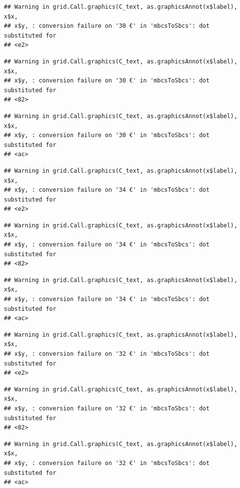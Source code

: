 \documentclass[]{gitbook}
\begin{document}
\begin{verbatim}
## Warning in grid.Call.graphics(C_text, as.graphicsAnnot(x$label), x$x,
## x$y, : conversion failure on '30 €' in 'mbcsToSbcs': dot substituted for
## <e2>
\end{verbatim}

\begin{verbatim}
## Warning in grid.Call.graphics(C_text, as.graphicsAnnot(x$label), x$x,
## x$y, : conversion failure on '30 €' in 'mbcsToSbcs': dot substituted for
## <82>
\end{verbatim}

\begin{verbatim}
## Warning in grid.Call.graphics(C_text, as.graphicsAnnot(x$label), x$x,
## x$y, : conversion failure on '30 €' in 'mbcsToSbcs': dot substituted for
## <ac>
\end{verbatim}

\begin{verbatim}
## Warning in grid.Call.graphics(C_text, as.graphicsAnnot(x$label), x$x,
## x$y, : conversion failure on '34 €' in 'mbcsToSbcs': dot substituted for
## <e2>
\end{verbatim}

\begin{verbatim}
## Warning in grid.Call.graphics(C_text, as.graphicsAnnot(x$label), x$x,
## x$y, : conversion failure on '34 €' in 'mbcsToSbcs': dot substituted for
## <82>
\end{verbatim}

\begin{verbatim}
## Warning in grid.Call.graphics(C_text, as.graphicsAnnot(x$label), x$x,
## x$y, : conversion failure on '34 €' in 'mbcsToSbcs': dot substituted for
## <ac>
\end{verbatim}

\begin{verbatim}
## Warning in grid.Call.graphics(C_text, as.graphicsAnnot(x$label), x$x,
## x$y, : conversion failure on '32 €' in 'mbcsToSbcs': dot substituted for
## <e2>
\end{verbatim}

\begin{verbatim}
## Warning in grid.Call.graphics(C_text, as.graphicsAnnot(x$label), x$x,
## x$y, : conversion failure on '32 €' in 'mbcsToSbcs': dot substituted for
## <82>
\end{verbatim}

\begin{verbatim}
## Warning in grid.Call.graphics(C_text, as.graphicsAnnot(x$label), x$x,
## x$y, : conversion failure on '32 €' in 'mbcsToSbcs': dot substituted for
## <ac>
\end{verbatim}
\end{document}
